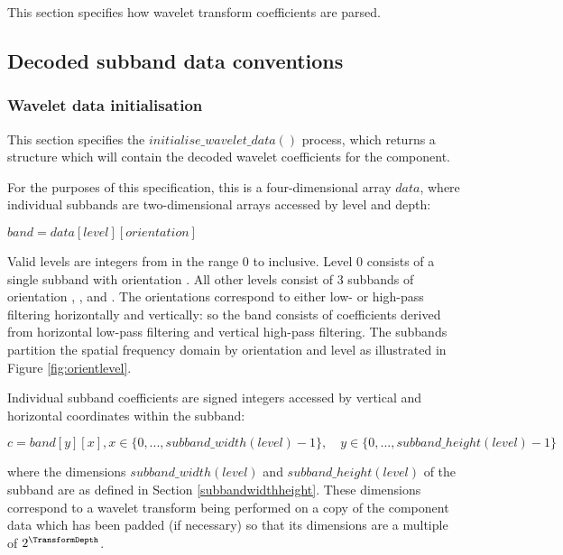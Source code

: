 
\label{transformdec}

This section specifies how wavelet transform coefficients are parsed.


\subsection{Decoded subband data conventions}
\label{wltdecodeconventions}

\subsubsection{Wavelet data initialisation}

\label{wltinit}

This section specifies the $initialise\_wavelet\_data()$ process, which returns a structure which will
contain the decoded wavelet coefficients for the component. 

For the purposes of this specification, this is a four-dimensional array $data$,
where individual subbands are two-dimensional arrays accessed by level and depth:

$band = data[level][orientation]$

Valid levels are integers from in the range 0 to \TransformDepth inclusive. 
Level 0 consists of a single subband with orientation \LL. 
All other levels consist of 3 subbands of orientation \LH, \HL, 
and \HH. The orientations correspond to either low- or high-pass filtering
horizontally and vertically: so the \LH band consists of coefficients derived
from horizontal low-pass filtering and vertical high-pass filtering. The subbands
partition the spatial frequency domain by orientation and level as illustrated
in Figure \ref{fig:orientlevel}.

Individual subband coefficients are signed integers accessed by vertical and 
horizontal coordinates within the subband:

$c = band[y][x], x\in\{0, ... , subband\_width(level)-1\},\quad 
y\in\{0, ... , subband\_height(level)-1\}$

where the dimensions $subband\_width(level)$ and $subband\_height(level)$ of the subband
are as defined in Section 
\ref{subbandwidthheight}. These dimensions correspond to a wavelet transform
being performed on a copy of the component data which has been padded (if necessary) so that its
dimensions are a multiple of $2^{\TransformDepth}$.

